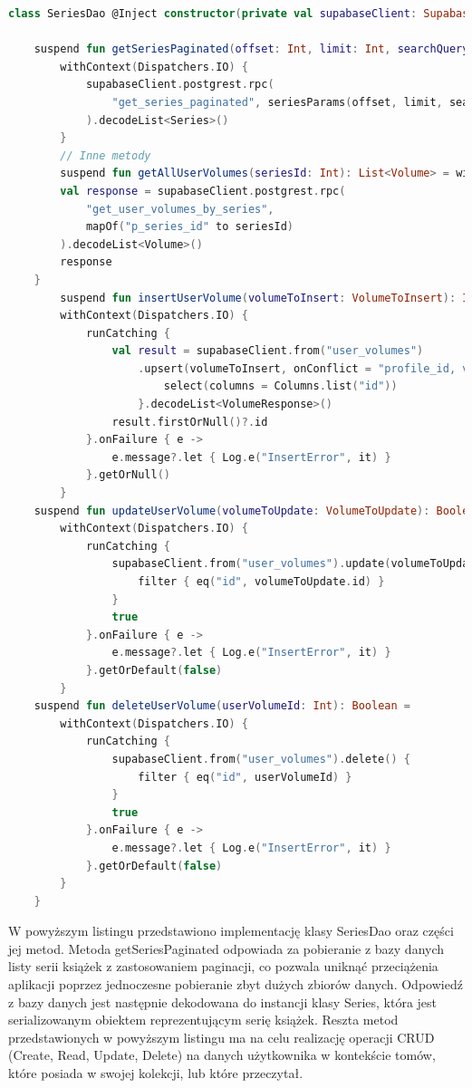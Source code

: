 \documentclass[12pt,twoside]{article}
\begin{document}
\begin{lstlisting}[language=Kotlin,caption=Data Transfer Object Series, label={SeriesDao}]
	class SeriesDao @Inject constructor(private val supabaseClient: SupabaseClient) {

    suspend fun getSeriesPaginated(offset: Int, limit: Int, searchQuery: String): List<Series> =
        withContext(Dispatchers.IO) {
            supabaseClient.postgrest.rpc(
                "get_series_paginated", seriesParams(offset, limit, searchQuery)
            ).decodeList<Series>()
        }
		// Inne metody
		suspend fun getAllUserVolumes(seriesId: Int): List<Volume> = withContext(Dispatchers.IO) {
        val response = supabaseClient.postgrest.rpc(
            "get_user_volumes_by_series",
            mapOf("p_series_id" to seriesId)
        ).decodeList<Volume>()
        response
    }
		suspend fun insertUserVolume(volumeToInsert: VolumeToInsert): Int? =
        withContext(Dispatchers.IO) {
            runCatching {
                val result = supabaseClient.from("user_volumes")
                    .upsert(volumeToInsert, onConflict = "profile_id, volume_id") {
                        select(columns = Columns.list("id"))
                    }.decodeList<VolumeResponse>()
                result.firstOrNull()?.id
            }.onFailure { e ->
                e.message?.let { Log.e("InsertError", it) }
            }.getOrNull()
        }
    suspend fun updateUserVolume(volumeToUpdate: VolumeToUpdate): Boolean =
        withContext(Dispatchers.IO) {
            runCatching {
                supabaseClient.from("user_volumes").update(volumeToUpdate) {
                    filter { eq("id", volumeToUpdate.id) }
                }
                true
            }.onFailure { e ->
                e.message?.let { Log.e("InsertError", it) }
            }.getOrDefault(false)
        }
    suspend fun deleteUserVolume(userVolumeId: Int): Boolean =
        withContext(Dispatchers.IO) {
            runCatching {
                supabaseClient.from("user_volumes").delete() {
                    filter { eq("id", userVolumeId) }
                }
                true
            }.onFailure { e ->
                e.message?.let { Log.e("InsertError", it) }
            }.getOrDefault(false)
        }
	}
\end{lstlisting}
W powyższym listingu przedstawiono implementację klasy SeriesDao oraz części jej metod. Metoda getSeriesPaginated 
odpowiada za pobieranie z bazy danych listy serii książek z zastosowaniem paginacji, co pozwala uniknąć przeciążenia 
aplikacji poprzez jednoczesne pobieranie zbyt dużych zbiorów danych. Odpowiedź z bazy danych jest następnie 
dekodowana do instancji klasy Series, która jest serializowanym obiektem reprezentującym serię książek. Reszta metod 
przedstawionych w powyższym listingu ma na celu realizację operacji CRUD (Create, Read, Update, Delete) na danych 
użytkownika w kontekście tomów, które posiada w swojej kolekcji, lub które przeczytał.
\end{document}
